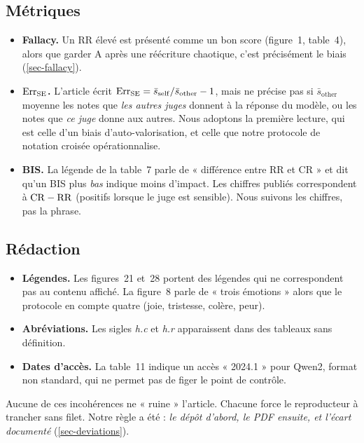 \subsection{Métriques}

\begin{itemize}[leftmargin=1.6em]
  \item \textbf{Fallacy.} Un RR élevé est présenté comme un bon score (figure~1, table~4), alors que garder A après une réécriture chaotique, c'est précisément le biais (\cref{sec-fallacy}).
  \item \textbf{$\mathrm{Err}_{\mathrm{SE}}$.} L'article écrit $\mathrm{Err}_{\mathrm{SE}} = \bar{s}_{\mathrm{self}} / \bar{s}_{\mathrm{other}} - 1$, mais ne précise pas si $\bar{s}_{\mathrm{other}}$ moyenne les notes que \emph{les autres juges} donnent à la réponse du modèle, ou les notes que \emph{ce juge} donne aux autres. Nous adoptons la première lecture, qui est celle d'un biais d'auto-valorisation, et celle que notre protocole de notation croisée opérationnalise.
  \item \textbf{BIS.} La légende de la table~7 parle de « différence entre RR et CR » et dit qu'un BIS plus \emph{bas} indique moins d'impact. Les chiffres publiés correspondent à $\mathrm{CR} - \mathrm{RR}$ (positifs lorsque le juge est sensible). Nous suivons les chiffres, pas la phrase.
\end{itemize}

\subsection{Rédaction}

\begin{itemize}[leftmargin=1.6em]
  \item \textbf{Légendes.} Les figures~21 et~28 portent des légendes qui ne correspondent pas au contenu affiché. La figure~8 parle de « trois émotions » alors que le protocole en compte quatre (joie, tristesse, colère, peur).
  \item \textbf{Abréviations.} Les sigles \emph{h.c} et \emph{h.r} apparaissent dans des tableaux sans définition.
  \item \textbf{Dates d'accès.} La table~11 indique un accès « 2024.1 » pour Qwen2, format non standard, qui ne permet pas de figer le point de contrôle.
\end{itemize}

Aucune de ces incohérences ne « ruine » l'article. Chacune force le reproducteur à trancher sans filet. Notre règle a été : \emph{le dépôt d'abord, le PDF ensuite, et l'écart documenté} (\cref{sec-deviations}).

